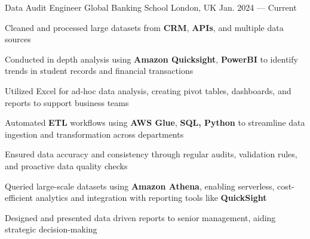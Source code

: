 
\begin{cventries}

  \cventry
  {Data Audit Engineer} %
  {\fontsize{10pt}{1em}\bodyfont\upshape\color{futurepurple} Global Banking School} %
  {London, UK} %
  {Jan. 2024 --- Current} %
  {
    \begin{cvitems} %
    \item {Cleaned and processed large datasets from \textbf{CRM}, \textbf{APIs}, and multiple data sources }
    \item {Conducted in depth analysis using \textbf{Amazon Quicksight}, \textbf{PowerBI} to identify trends in student records and financial transactions}
    \item {Utilized Excel for ad-hoc data analysis, creating pivot tables, dashboards, and reports to support business teams}
    \item {Automated \textbf{ETL} workflows using \textbf{AWS Glue}, \textbf{SQL, Python} to streamline data ingestion and transformation across departments}
    \item {Ensured data accuracy and consistency through regular audits, validation rules, and proactive data quality checks}
    \item {Queried large-scale datasets using \textbf{Amazon Athena}, enabling serverless, cost-efficient analytics and integration with reporting tools like \textbf{QuickSight}}
    \item {Designed and presented data driven reports to senior management, aiding strategic decision-making}
    \end{cvitems}
  }


\end{cventries}
